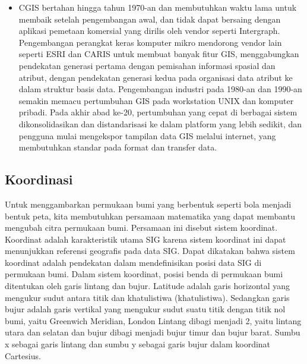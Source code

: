 \begin{itemize}
	\item CGIS bertahan hingga tahun 1970-an dan membutuhkan waktu lama untuk membaik setelah pengembangan awal, dan tidak dapat bersaing dengan aplikasi pemetaan komersial yang dirilis oleh vendor seperti Intergraph. Pengembangan perangkat keras komputer mikro mendorong vendor lain seperti ESRI dan CARIS untuk membuat banyak fitur GIS, menggabungkan pendekatan generasi pertama dengan pemisahan informasi spasial dan atribut, dengan pendekatan generasi kedua pada organisasi data atribut ke dalam struktur basis data. Pengembangan industri pada 1980-an dan 1990-an semakin memacu pertumbuhan GIS pada workstation UNIX dan komputer pribadi. Pada akhir abad ke-20, pertumbuhan yang cepat di berbagai sistem dikonsolidasikan dan distandarisasi ke dalam platform yang lebih sedikit, dan pengguna mulai mengekspor tampilan data GIS melalui internet, yang membutuhkan standar pada format dan transfer data.
\end{itemize}



\subsection{Koordinasi}
Untuk menggambarkan permukaan bumi yang berbentuk seperti bola menjadi bentuk peta, kita membutuhkan persamaan matematika yang dapat membantu mengubah citra permukaan bumi. Persamaan ini disebut sistem koordinat. Koordinat adalah karakteristik utama SIG karena sistem koordinat ini dapat menunjukkan referensi geografis pada data SIG. Dapat dikatakan bahwa sistem koordinat adalah pendekatan dalam mendefinisikan posisi data SIG di permukaan bumi.
Dalam sistem koordinat, posisi benda di permukaan bumi ditentukan oleh garis lintang dan bujur. Latitude adalah garis horizontal yang mengukur sudut antara titik dan khatulistiwa (khatulistiwa). Sedangkan garis bujur adalah garis vertikal yang mengukur sudut suatu titik dengan titik nol bumi, yaitu Greenwich Meridian, London
Lintang dibagi menjadi 2, yaitu lintang utara dan selatan dan bujur dibagi menjadi bujur timur dan bujur barat. Sumbu x sebagai garis lintang dan sumbu y sebagai garis bujur dalam koordinat Cartesius.

